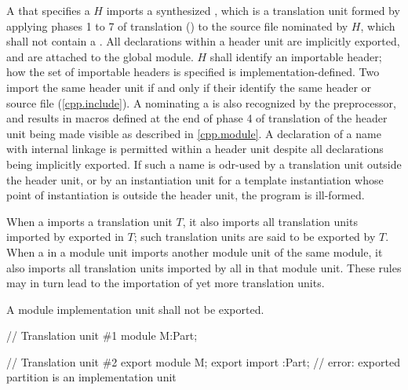 \begin{std.txt}
  \alinea
  A  that specifies
  a  $H$ imports
  a synthesized ,
  which is a translation unit formed by applying
  phases 1 to 7 of translation ()
  to the source file nominated by $H$,
  which shall not contain a .
  \enternote
  All declarations within a header unit are implicitly
  exported, and are attached to the global module.
  \exitnote
  $H$ shall identify an importable header;
  how the set of importable headers is specified
  is implementation-defined.
  Two
  import the same header unit if and only if
  their  identify the same
  header or source file (\ref{cpp.include}).
  \enternote
  A  nominating
  a  is also recognized by the
  preprocessor, and results in macros defined at the
  end of phase 4 of translation of the header unit
  being made visible as described in \ref{cpp.module}.
  \exitnote
  A declaration of a name with internal linkage is
  permitted within a header unit despite all
  declarations being implicitly exported.
  If such a name is
  odr-used by a translation unit outside the
  header unit, or by an instantiation unit for a template
  instantiation whose point of instantiation is outside
  the header unit, the program is ill-formed.

  \alinea
  When a  imports
  a translation unit $T$, it also imports
  all translation units imported by
  exported 
  in $T$; such translation units are
  said to be exported by $T$.
  When a  in a module unit imports
  another module unit of the same module, it also imports
  all translation units imported by
  all 
  in that module unit.
  These rules may in turn lead to the importation of yet more
  translation units.

  \alinea
  \color{addclr}
  A module implementation unit shall not be exported.
  \begin{example}
  \begin{Program}
// Translation unit \#1
module M:Part;

// Translation unit \#2
export module M;
export import :Part;    // error: exported partition  is an implementation unit
  \end{Program}
  \end{example}


\end{std.txt}
